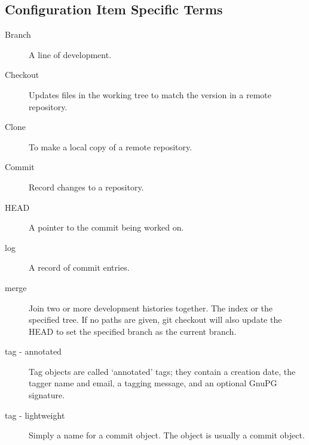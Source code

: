 \subsection{Configuration Item Specific Terms}
\begin{description}
\item[Branch] \quad A line of development.

\item[Checkout] \quad Updates files in the working tree to match the version in
  a remote repository.

\item[Clone] \quad To make a local copy of a remote repository.

\item[Commit] \quad Record changes to a repository.

\item[HEAD] \quad A pointer to the commit being worked on.

\item[log] \quad A record of commit entries.

\item[merge] \quad Join two or more development histories together.  The index
  or the specified tree.  If no paths are given, git checkout will also update
  the HEAD to set the specified branch as the current branch.

\item[tag - annotated] \quad Tag objects are called `annotated' tags; they
  contain a creation date, the tagger name and email, a tagging message, and an
  optional GnuPG signature.

\item[tag - lightweight] \quad Simply a name for a commit object.  The object is
  usually a commit object.

\end{description}
